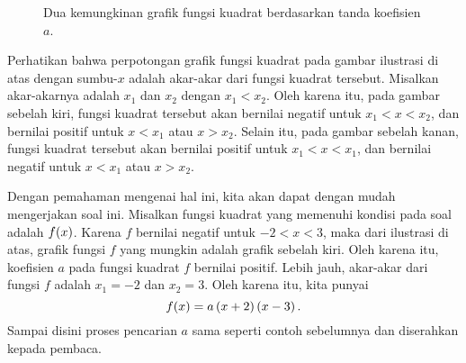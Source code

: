 \begin{jawab}
\begin{figure}[H]
\begin{multicols}{2}
			\end{multicols}
			\caption{Dua kemungkinan grafik fungsi kuadrat berdasarkan tanda koefisien $ a $.}
		\end{figure}
		Perhatikan bahwa perpotongan grafik fungsi kuadrat pada gambar ilustrasi di atas dengan sumbu-$ x $ adalah akar-akar dari fungsi kuadrat tersebut. Misalkan akar-akarnya adalah $ x_{1} $ dan $ x_{2} $ dengan $ x_{1} < x_{2} $. Oleh karena itu, pada gambar sebelah kiri, fungsi kuadrat tersebut akan bernilai negatif untuk $ x_{1} < x < x_{2} $, dan bernilai positif untuk $ x < x_{1} $ atau $ x > x_{2} $. Selain itu, pada gambar sebelah kanan, fungsi kuadrat tersebut akan bernilai positif untuk $ x_{1} < x < x_{1} $, dan bernilai negatif untuk $ x < x_{1} $ atau $ x > x_{2} $.
		\par Dengan pemahaman mengenai hal ini, kita akan dapat dengan mudah mengerjakan soal ini. Misalkan fungsi kuadrat yang memenuhi kondisi pada soal adalah $ \mathop{}\!{f}{\left({x}\right)} $. Karena $ f $ bernilai negatif untuk $ -2 < x < 3 $, maka dari ilustrasi di atas, grafik fungsi $ f $ yang mungkin adalah grafik sebelah kiri. Oleh karena itu, koefisien $ a $ pada fungsi kuadrat $ f $ bernilai positif. Lebih jauh, akar-akar dari fungsi $ f $ adalah $ x_{1} = -2 $ dan $ x_{2} = 3 $. Oleh karena itu, kita punyai
		\[ \mathop{}\!{f}{\left({x}\right)} = a\left(x + 2\right)\left(x - 3\right). \]
		Sampai disini proses pencarian $ a $ sama seperti contoh sebelumnya dan diserahkan kepada pembaca.
	\end{jawab}
	
